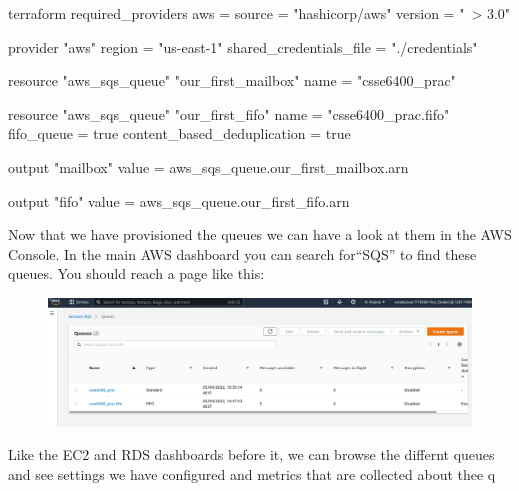\documentclass{csse4400}
\begin{document}

\begin{code}[language=terraform, numbers=none]{}
  terraform {
    required_providers {
      aws = {
        source = "hashicorp/aws"
        version = "~> 3.0"
      }
    }
  }
  
  provider "aws" {
    region = "us-east-1"
    shared_credentials_file = "./credentials"
  }
  
  resource "aws_sqs_queue" "our_first_mailbox" {
    name                        = "csse6400_prac"
  }
  
  resource "aws_sqs_queue" "our_first_fifo" {
    name                        = "csse6400_prac.fifo"
    fifo_queue                  = true
    content_based_deduplication = true
  }
  
  output "mailbox" {
      value = aws_sqs_queue.our_first_mailbox.arn
  }
  
  output "fifo" {
      value = aws_sqs_queue.our_first_fifo.arn
  }
\end{code}

Now that we have provisioned the queues we can have a look at them in the AWS Console.
In the main AWS dashboard you can search for``SQS'' to find these queues.
You should reach a page like this:

\begin{figure}[H]
  \includegraphics[width=\textwidth]{images/sqspanel}
\end{figure}

Like the EC2 and RDS dashboards before it, we can browse the differnt queues and see settings we have configured and metrics that are collected about thee q
  
\end{document}
